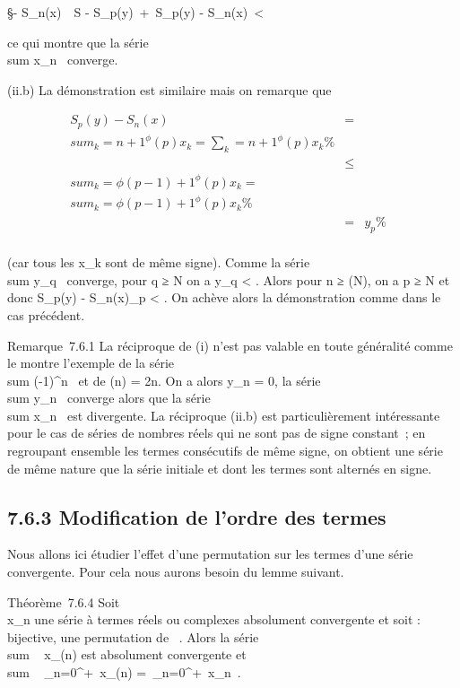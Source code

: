 \documentclass[]{article}
\begin{document}
\S - S_n(x)\
\leq\ S -
S_p(y)\ +\
S_p(y) - S_n(x)\ <
\epsilon

ce qui montre que la série
\\sum  x_n~
converge.

(ii.b) La démonstration est similaire mais on remarque que

\begin{align*} S_p(y) -
S_n(x)& =& \\sum
_k=n+1^\phi(p)x_ k =
\sum _k=n+1^\phi(p)x_
k \%& \\ & \leq&
\\sum
_k=\phi(p-1)+1^\phi(p)x_ k =
\\sum
_k=\phi(p-1)+1^\phi(p)x_ k\%&
\\ & =& y_p
\%& \\ \end{align*}

(car tous les x_k sont de même signe). Comme la série
\\sum  y_q~
converge, pour q ≥ N on a y_q <
\epsilon {} . Alors pour n ≥ \phi(N), on a p ≥ N et donc
S_p(y) -
S_n(x)\leqy_p <
\epsilon {} . On achève alors la démonstration comme dans
le cas précédent.

Remarque~7.6.1 La réciproque de (i) n'est pas valable en toute
généralité comme le montre l'exemple de la série
\\sum  (-1)^n~
et de \phi(n) = 2n. On a alors y_n = 0, la série
\\sum  y_n~
converge alors que la série
\\sum  x_n~ est
divergente. La réciproque (ii.b) est particulièrement intéressante pour
le cas de séries de nombres réels qui ne sont pas de signe constant~; en
regroupant ensemble les termes consécutifs de même signe, on obtient une
série de même nature que la série initiale et dont les termes sont
alternés en signe.

\subsection{7.6.3 Modification de l'ordre des termes}

Nous allons ici étudier l'effet d'une permutation sur les termes d'une
série convergente. Pour cela nous aurons besoin du lemme suivant.

Théorème~7.6.4 Soit \\\sum
 x_n une série à termes réels ou complexes absolument
convergente et soit \sigma : ~ \rightarrow~ ~ bijective, une permutation de ~. Alors la
série \\sum ~
x_\sigma(n) est absolument convergente et
\\sum ~
_n=0^+\infty~x_\sigma(n) =\
\sum  _n=0^+\infty~x_n~.
\end{document}
